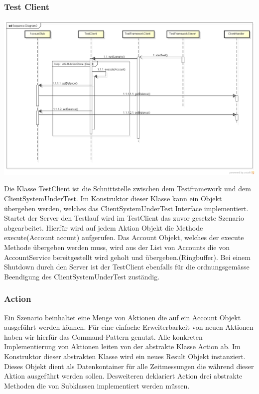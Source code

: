 \subsubsection{Test Client}
\label{sec:testclient}

\begin{center}
\includegraphics[scale=0.3]{image_testFramework/startTest.png}
\end{center}

Die Klasse TestClient ist die Schnittstelle zwischen dem Testframework und dem ClientSystemUnderTest. Im Konstruktor dieser Klasse kann ein Objekt übergeben werden, welches das ClientSystemUnderTest Interface implementiert. Startet der Server den Testlauf wird im TestClient das zuvor gesetzte Szenario abgearbeitet. Hierfür wird auf jedem Aktion Objekt die Methode execute(Account accunt) aufgerufen. Das Account Objekt, welches der execute Methode übergeben werden muss, wird aus der List von Accounts die von AccountService bereitgestellt wird geholt und übergeben.(Ringbuffer). Bei einem Shutdown durch den Server ist der TestClient ebenfalls für die ordnungsgemässe Beendigung des ClientSystemUnderTest zuständig.

\subsubsection{Action}
\label{sec:action}
Ein Szenario beinhaltet eine Menge von Aktionen die auf ein Account Objekt ausgeführt werden können. Für eine einfache Erweiterbarkeit von neuen Aktionen haben wir hierfür das Command-Pattern genutzt. Alle konkreten Implementierung von Aktionen leiten von der abstrakte Klasse Action ab. Im Konstruktor  dieser abstrakten Klasse wird ein neues Result Objekt instanziert. Dieses Objekt dient als Datenkontainer für alle Zeitmessungen die während dieser Aktion ausgeführt werden sollen. Desweiteren deklariert Action drei abstrakte Methoden die von Subklassen implementiert werden müssen.

